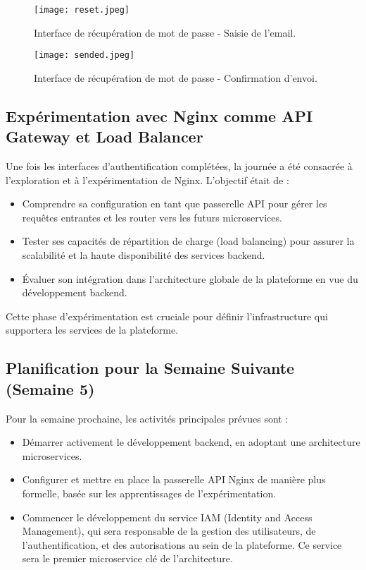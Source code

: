 \documentclass[12pt, a4paper]{article}
\begin{document}
\begin{figure}[htbp]
  \centering
  \texttt{[image: reset.jpeg]} 
  \caption{Interface de récupération de mot de passe - Saisie de l'email.}
  \label{fig:forgot_password_email}
\end{figure}

\begin{figure}[htbp]
  \centering
  \texttt{[image: sended.jpeg]} 
  \caption{Interface de récupération de mot de passe - Confirmation d'envoi.}
  \label{fig:forgot_password_confirmation}
\end{figure}

\newpage

\subsection{Expérimentation avec Nginx comme API Gateway et Load Balancer}
Une fois les interfaces d'authentification complétées, la journée a été consacrée à l'exploration et à l'expérimentation de Nginx. L'objectif était de :
\begin{itemize}
    \item Comprendre sa configuration en tant que passerelle API pour gérer les requêtes entrantes et les router vers les futurs microservices.
    \item Tester ses capacités de répartition de charge (load balancing) pour assurer la scalabilité et la haute disponibilité des services backend.
    \item Évaluer son intégration dans l'architecture globale de la plateforme en vue du développement backend.
\end{itemize}
Cette phase d'expérimentation est cruciale pour définir l'infrastructure qui supportera les services de la plateforme.



\subsection{Planification pour la Semaine Suivante (Semaine 5)}
Pour la semaine prochaine, les activités principales prévues sont :
\begin{itemize}
  \item Démarrer activement le développement backend, en adoptant une architecture microservices.
  \item Configurer et mettre en place la passerelle API Nginx de manière plus formelle, basée sur les apprentissages de l'expérimentation.
  \item Commencer le développement du service IAM (Identity and Access Management), qui sera responsable de la gestion des utilisateurs, de l'authentification, et des autorisations au sein de la plateforme. Ce service sera le premier microservice clé de l'architecture.
\end{itemize}
\end{document}
